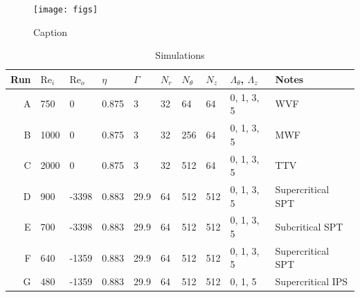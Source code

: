 \documentclass[openacc]{rstransa}%
\newcommand{\Reyn}{\mathrm{Re}}
\begin{document}
\begin{figure}
    \centering
    \texttt{[image: figs]}
    \caption{Caption}
    \label{fig:my_label}
\end{figure}

\begin{table}[!h]
\caption{Simulations}
\label{tab:simulations}
\begin{tabular}{rlllllllll}
\hline
Run & $\Reyn_i$ & $\Reyn_o$ & $\eta$ & $\Gamma$  & $N_r$ & $N_\theta$ & $N_z$& $\Lambda_\theta$, $\Lambda_z$ & Notes\\
\hline
A & 750  & 0 & 0.875  & 3 & 32 & 64 & 64 & 0, 1, 3, 5 & WVF\\
B & 1000 & 0 & 0.875 & 3 & 32 & 256 & 64 & 0, 1, 3, 5 & MWF\\
C & 2000 & 0 & 0.875 & 3 & 32 & 512 & 64 & 0, 1, 3, 5 & TTV\\
\hline
D & 900 & -3398 & 0.883 & 29.9 & 64 & 512 & 512 & 0, 1, 3, 5 & Supercritical SPT\\
E & 700 & -3398 & 0.883 & 29.9 & 64 & 512 & 512 & 0, 1, 3, 5 & Subcritical SPT\\
\hline
F & 640 & -1359 & 0.883 & 29.9 & 64 & 512 & 512 & 0, 1, 3, 5 & Supercritical SPT\\
G & 480 & -1359 & 0.883 & 29.9 & 64 & 512 & 512 & 0, 1, 5 & Supercritical IPS\\
\end{tabular}
\vspace*{-4pt}
\end{table}%


\end{document}
